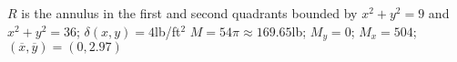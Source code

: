{$R$ is the annulus in the first and second quadrants  bounded by $x^2+y^2=9$ and $x^2+y^2=36$; $\delta(x,y) = 4$lb/ft$^2$
}
{$M = 54\pi\approx 169.65$lb; $M_y= 0$; $M_x = 504$; $(\overline{x},\overline{y}) = (0,2.97)$
}
